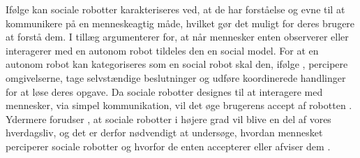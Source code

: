 Ifølge \textcite[s. 1]{PDF:SharingALifeHarvey} kan sociale robotter karakteriseres ved, at de har forståelse og evne til at kommunikere på en menneskeagtig måde, hvilket gør det muligt for deres brugere at forstå dem. I tillæg argumenterer \textcite[s. 168]{PDF:TowardSociableRobots} for, at når mennesker enten observerer eller interagerer med en autonom robot tildeles den en social model. For at en autonom robot kan kategoriseres som en social robot skal den, ifølge \textcite[s. 168]{PDF:TowardSociableRobots}, percipere omgivelserne, tage selvstændige beslutninger og udføre koordinerede handlinger for at løse deres opgave. Da sociale robotter designes til at interagere med mennesker, via simpel kommunikation, vil det øge brugerens accept af robotten \parencite[s. 1476]{PDF:ExploringInfluencingVariable}. Ydermere forudser \textcite[s. 1476]{PDF:ExploringInfluencingVariable}, at sociale robotter i højere grad vil blive en del af vores hverdagsliv, og det er derfor nødvendigt at undersøge, hvordan mennesket perciperer sociale robotter og hvorfor de enten accepterer eller afviser dem \parencite[s. 1]{PDF:SharingALifeHarvey}.  



